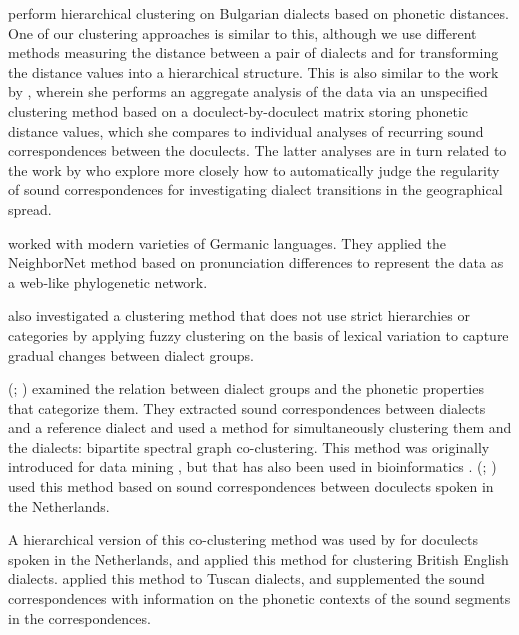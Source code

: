 \documentclass[a4paper]{article}
\begin{document}
\citet{prokic2012detecting} perform hierarchical clustering
on Bulgarian dialects based on phonetic distances.
One of our clustering approaches is similar to this,
although we use different methods measuring the distance between a pair of dialects
and for transforming the distance values into a hierarchical structure.
This is also similar to the work by \citet{prokic2007identifying},
wherein she performs an aggregate analysis of the
data via an unspecified clustering method based on a
doculect-by-doculect matrix storing phonetic distance values,
which she compares to individual analyses of recurring sound correspondences
between the doculects.
The latter analyses are in turn related to the work by
\citet{prokic2013combining} who explore more closely how
to automatically judge the regularity of sound correspondences
for investigating dialect transitions in the geographical spread.

\citet{heggarty2010splits} worked with modern varieties of Germanic languages.
They applied the NeighborNet method \citep{bryant2004neighbornet}
based on pronunciation differences to represent the data as a
web-like phylogenetic network.

\citet{proell2013detecting} also investigated a clustering method
that does not use strict hierarchies or categories by
applying fuzzy clustering on the basis of lexical variation
to capture gradual changes between dialect groups.

\citeauthor{wieling2011bipartite} (\citeyear{wieling2009bipartite}; \citeyear{wieling2011bipartite})
examined the relation between dialect groups and
the phonetic properties that categorize them.
They extracted sound correspondences between dialects
and a reference dialect and used a method for simultaneously clustering 
them and the dialects: bipartite spectral graph co-clustering.
This method was originally introduced for data mining \citep{dhillon2001co-clustering, zha2001bipartite},
but that has also been used in bioinformatics \citep{kluger2003spectral}.
\citeauthor{wieling2011bipartite}
(\citeyear{wieling2009bipartite}; \citeyear{wieling2011bipartite})
used this method based on sound correspondences between doculects
spoken in the Netherlands.

A hierarchical version of this co-clustering method
was used by \citet{wieling2010hierarchical} for
doculects spoken in the Netherlands,
and \citet{wieling2013analyzing} applied this method for
clustering British English dialects.
\citet{montemagni2013synchronic} applied this method to Tuscan dialects,
and supplemented the sound correspondences with information
on the phonetic contexts of the sound segments in the correspondences.
\end{document}
